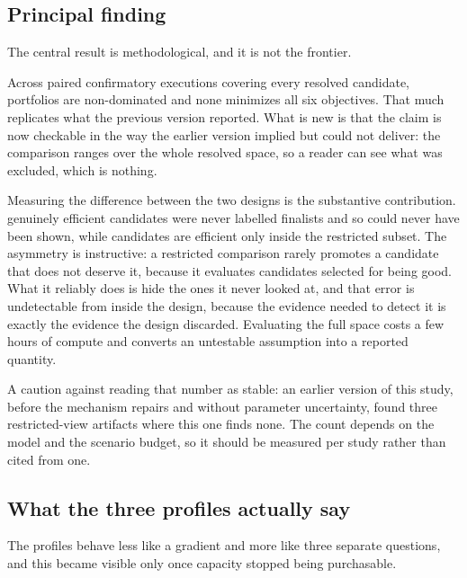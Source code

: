 \subsection{Principal finding}

The central result is methodological, and it is not the frontier.

Across \ConfirmTotalExecutions{} paired confirmatory executions covering
every resolved candidate, \ConfirmFullSpaceFrontier{} portfolios are
non-dominated and none minimizes all six objectives. That much replicates
what the previous version reported. What is new is that the claim is now
checkable in the way the earlier version implied but could not deliver: the
comparison ranges over the whole resolved space, so a reader can see what was
excluded, which is nothing.

Measuring the difference between the two designs is the substantive
contribution. \ConfirmNonFinalistsOnFrontier{} genuinely efficient candidates
were never labelled finalists and so could never have been shown, while
\ConfirmFinalistOnlyArtifacts{} candidates are efficient only inside the
restricted subset. The asymmetry is instructive: a restricted comparison
rarely promotes a candidate that does not deserve it, because it evaluates
candidates selected for being good. What it reliably does is hide the ones it
never looked at, and that error is undetectable from inside the design,
because the evidence needed to detect it is exactly the evidence the design
discarded. Evaluating the full space costs a few hours of compute and
converts an untestable assumption into a reported quantity.

A caution against reading that number as stable: an earlier version of this
study, before the mechanism repairs and without parameter uncertainty, found
three restricted-view artifacts where this one finds none. The count depends
on the model and the scenario budget, so it should be measured per study
rather than cited from one.

\subsection{What the three profiles actually say}

The profiles behave less like a gradient and more like three separate
questions, and this became visible only once capacity stopped being
purchasable.

